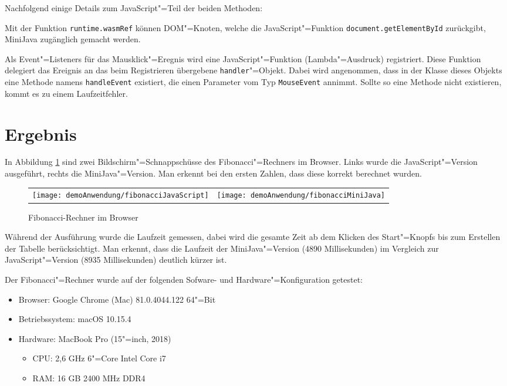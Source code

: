 


Nachfolgend einige Details zum JavaScript"=Teil der beiden Methoden:

Mit der Funktion \lstinline{runtime.wasmRef} können DOM"=Knoten, welche die JavaScript"=Funktion \lstinline{document.getElementById} zurückgibt, MiniJava zugänglich gemacht werden.

Als Event"=Listeners für das Mausklick"=Eregnis wird eine JavaScript"=Funktion (Lambda"=Ausdruck) registriert. Diese Funktion delegiert das Ereignis an das beim Registrieren übergebene \lstinline{handler}"=Objekt. Dabei wird angenommen, dass in der Klasse dieses Objekts eine Methode namens \lstinline{handleEvent} existiert, die einen Parameter vom Typ \lstinline{MouseEvent} annimmt. Sollte so eine Methode nicht existieren, kommt es zu einem Laufzeitfehler.

\section{Ergebnis}

In Abbildung \ref{fig:fibCalculatorBrowser} sind zwei Bildschirm"=Schnappschüsse des Fibonacci"=Rechners im Browser. Links wurde die JavaScript"=Version ausgeführt, rechts die MiniJava"=Version. Man erkennt bei den ersten Zahlen, dass diese korrekt berechnet wurden.

\begin{figure}[]
    \centering
    \begin{tabular}{c c}
        \texttt{[image: demoAnwendung/fibonacciJavaScript]} & \texttt{[image: demoAnwendung/fibonacciMiniJava]}
    \end{tabular}
    \caption{Fibonacci-Rechner im Browser}
    \label{fig:fibCalculatorBrowser}
\end{figure}

Während der Ausführung wurde die Laufzeit gemessen, dabei wird die gesamte Zeit ab dem Klicken des Start"=Knopfs bis zum Erstellen der Tabelle berücksichtigt. Man erkennt, dass die Laufzeit der MiniJava"=Version (4890 Millisekunden) im Vergleich zur JavaScript"=Version (8935 Millisekunden) deutlich kürzer ist.

Der Fibonacci"=Rechner wurde auf der folgenden Sofware- und Hardware"=Konfiguration getestet:
\begin{itemize}
    \item Browser: Google Chrome (Mac) 81.0.4044.122 64"=Bit
    \item Betriebssystem: macOS 10.15.4
    \item Hardware: MacBook Pro (15"=inch, 2018)
    \begin{itemize}
        \item CPU: 2,6 GHz 6"=Core Intel Core i7
        \item RAM: 16 GB 2400 MHz DDR4
    \end{itemize}
\end{itemize}

